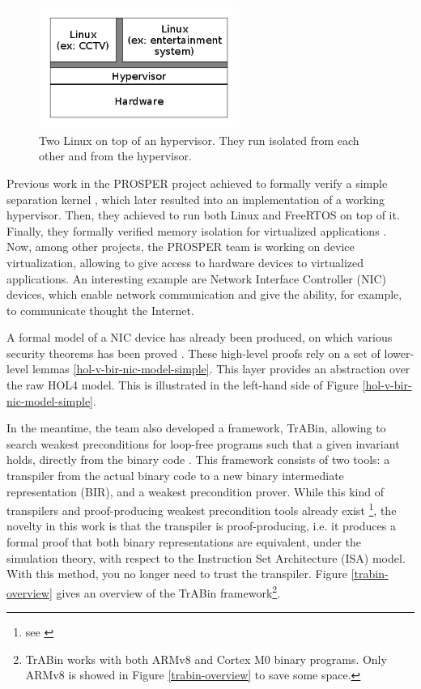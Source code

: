 \documentclass{kththesis}
\begin{document}
\begin{figure}
	\includegraphics[height=4cm]{figures/figure-1.png}
	\centering
	\caption{
		Two Linux on top of an hypervisor. They run isolated from each other
		and from the hypervisor.
	}
	\label{2-Linux-on-hypervisor-intro}
\end{figure}

Previous work in the PROSPER project achieved \cite{noauthor_prosper:_nodate-1}
to formally verify a simple separation kernel \cite{dam_formal_2013}, which
later resulted into an implementation of a working hypervisor. Then, they
achieved to run both Linux and FreeRTOS on top of it. Finally, they formally
verified memory isolation for virtualized applications
\cite{nemati_trustworthy_2015}. Now, among other projects, the PROSPER team is
working on device virtualization, allowing to give access to hardware devices to
virtualized applications. An interesting example are Network Interface
Controller (NIC) devices, which enable network communication and give the
ability, for example, to communicate thought the Internet.

A formal model of a NIC device has already been produced, on which various
security theorems has been proved \cite{haglund_formal_2016}. These high-level
proofs rely on a set of lower-level lemmas \ref{hol-v-bir-nic-model-simple}.
This layer provides an abstraction over the raw HOL4 model. This is illustrated
in the left-hand side of Figure \ref{hol-v-bir-nic-model-simple}.

In the meantime, the team also developed a framework, TrABin, allowing to search
weakest preconditions for loop-free programs such that a given invariant holds,
directly from the binary code \cite{lindner_trabin:_2019}. This framework
consists of two tools: a transpiler from the actual binary code to a new binary
intermediate representation (BIR), and a weakest precondition prover. While this
kind of transpilers and proof-producing weakest precondition tools already exist
\footnote{see \cite{lindner_trabin:_2019}}, the novelty in this work is that the
transpiler is proof-producing, i.e. it produces a formal proof that both binary
representations are equivalent, under the simulation theory, with respect to the
Instruction Set Architecture (ISA) model. With this method, you no longer need
to trust the transpiler. Figure \ref{trabin-overview} gives an overview of the
TrABin framework\footnote{TrABin works with both ARMv8 and Cortex M0 binary
	programs. Only ARMv8 is showed in Figure \ref{trabin-overview} to save some
space.}.
\end{document}
